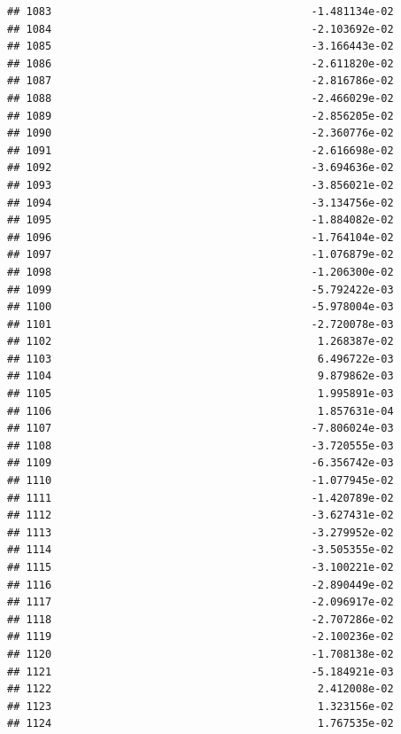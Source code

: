 \documentclass[
]{article}
\begin{document}
\begin{verbatim}
## 1083                                         -1.481134e-02
## 1084                                         -2.103692e-02
## 1085                                         -3.166443e-02
## 1086                                         -2.611820e-02
## 1087                                         -2.816786e-02
## 1088                                         -2.466029e-02
## 1089                                         -2.856205e-02
## 1090                                         -2.360776e-02
## 1091                                         -2.616698e-02
## 1092                                         -3.694636e-02
## 1093                                         -3.856021e-02
## 1094                                         -3.134756e-02
## 1095                                         -1.884082e-02
## 1096                                         -1.764104e-02
## 1097                                         -1.076879e-02
## 1098                                         -1.206300e-02
## 1099                                         -5.792422e-03
## 1100                                         -5.978004e-03
## 1101                                         -2.720078e-03
## 1102                                          1.268387e-02
## 1103                                          6.496722e-03
## 1104                                          9.879862e-03
## 1105                                          1.995891e-03
## 1106                                          1.857631e-04
## 1107                                         -7.806024e-03
## 1108                                         -3.720555e-03
## 1109                                         -6.356742e-03
## 1110                                         -1.077945e-02
## 1111                                         -1.420789e-02
## 1112                                         -3.627431e-02
## 1113                                         -3.279952e-02
## 1114                                         -3.505355e-02
## 1115                                         -3.100221e-02
## 1116                                         -2.890449e-02
## 1117                                         -2.096917e-02
## 1118                                         -2.707286e-02
## 1119                                         -2.100236e-02
## 1120                                         -1.708138e-02
## 1121                                         -5.184921e-03
## 1122                                          2.412008e-02
## 1123                                          1.323156e-02
## 1124                                          1.767535e-02

\end{verbatim}
\end{document}
